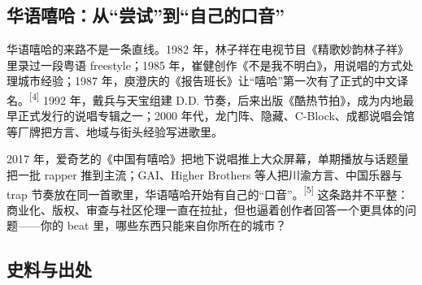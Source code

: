 \subsection{华语嘻哈：从“尝试”到“自己的口音”}
\label{sec:hiphop-history-china}

华语嘻哈的来路不是一条直线。1982 年，林子祥在电视节目《精歌妙韵林子祥》里录过一段粤语 freestyle；1985 年，崔健创作《不是我不明白》，用说唱的方式处理城市经验；1987 年，庾澄庆的《报告班长》让“嘻哈”第一次有了正式的中文译名。{\textsuperscript{[4]}} 1992 年，戴兵与天宝组建 D.D. 节奏，后来出版《酷热节拍》，成为内地最早正式发行的说唱专辑之一；2000 年代，龙门阵、隐藏、C-Block、成都说唱会馆等厂牌把方言、地域与街头经验写进歌里。

2017 年，爱奇艺的《中国有嘻哈》把地下说唱推上大众屏幕，单期播放与话题量把一批 rapper 推到主流；GAI、Higher Brothers 等人把川渝方言、中国乐器与 trap 节奏放在同一首歌里，华语嘻哈开始有自己的“口音”。{\textsuperscript{[5]}} 这条路并不平整：商业化、版权、审查与社区伦理一直在拉扯，但也逼着创作者回答一个更具体的问题——你的 beat 里，哪些东西只能来自你所在的城市？

\subsection{史料与出处}
\label{sec:hiphop-sources}

